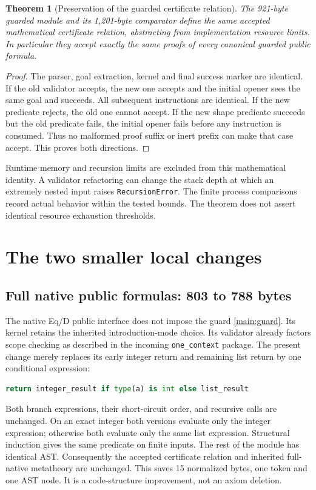 \documentclass[11pt,letterpaper]{article}
\newtheorem{theorem}{Theorem}[section]
\theoremstyle{definition}\newtheorem{definition}[theorem]{Definition}
\theoremstyle{remark}\newtheorem{remark}[theorem]{Remark}
\begin{document}
\begin{theorem}[Preservation of the guarded certificate relation]
The 921-byte guarded module and its 1,201-byte comparator define the
same accepted mathematical certificate relation, abstracting from
implementation resource limits. In particular they accept exactly the
same proofs of every canonical guarded public formula.
\end{theorem}
\begin{proof}
The parser, goal extraction, kernel and final success marker are
identical. If the old validator accepts, the new one accepts and the
initial opener sees the same goal and succeeds. All subsequent
instructions are identical. If the new predicate rejects, the old one
cannot accept. If the new shape predicate succeeds but the old predicate
fails, the initial opener fails before any instruction is consumed.
Thus no malformed proof suffix or inert prefix can make that case
accept. This proves both directions.
\end{proof}

Runtime memory and recursion limits are excluded from this mathematical
identity. A validator refactoring can change the stack depth at which
an extremely nested input raises \texttt{RecursionError}. The finite
process comparisons record actual behavior within the tested bounds.
The theorem does not assert identical resource exhaustion thresholds.

\section{The two smaller local changes}
\label{sec:local}

\subsection{Full native public formulas: 803 to 788 bytes}

The native Eq/D public interface does not impose the guard
\eqref{main:guard}. Its kernel retains the inherited introduction-mode
choice. Its validator already factors scope checking as described in the
incoming \texttt{one\_context} package. The present change merely replaces
its early integer return and remaining list return by one conditional
expression:
\begin{lstlisting}[language=Python]
return integer_result if type(a) is int else list_result
\end{lstlisting}
Both branch expressions, their short-circuit order, and recursive calls
are unchanged. On an exact integer both versions evaluate only the
integer expression; otherwise both evaluate only the same list
expression. Structural induction gives the same predicate on finite
inputs. The rest of the module has identical AST. Consequently the
accepted certificate relation and inherited full-native metatheory are
unchanged. This saves 15 normalized bytes, one token and one AST node.
It is a code-structure improvement, not an axiom deletion.
\end{document}
